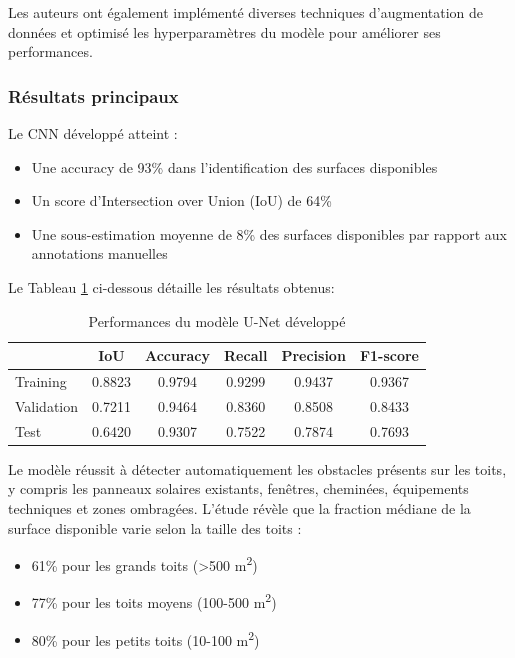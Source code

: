 \par{Les auteurs ont également implémenté diverses techniques d'augmentation de données et optimisé les hyperparamètres du modèle pour améliorer ses performances.}

\subsubsection{Résultats principaux}
Le CNN développé atteint :
\begin{itemize}
    \item Une accuracy de 93\% dans l'identification des surfaces disponibles
    \item Un score d'Intersection over Union (IoU) de 64\%
    \item Une sous-estimation moyenne de 8\% des surfaces disponibles par rapport aux annotations manuelles
\end{itemize}
\par{Le Tableau \ref{tab:castello_quantification_resultats} ci-dessous détaille les résultats obtenus:}
\begin{table}[H]
    \centering
    \begin{tabular}{|l|c|c|c|c|c|}
    \hline
     & IoU & Accuracy & Recall & Precision & F1-score \\
    \hline
    Training & 0.8823 & 0.9794 & 0.9299 & 0.9437 & 0.9367 \\
    Validation & 0.7211 & 0.9464 & 0.8360 & 0.8508 & 0.8433 \\
    Test & 0.6420 & 0.9307 & 0.7522 & 0.7874 & 0.7693 \\
    \hline
    \end{tabular}
    \caption{Performances du modèle U-Net développé}
\label{tab:castello_quantification_resultats}
\end{table}

\par{Le modèle réussit à détecter automatiquement les obstacles présents sur les toits, y compris les panneaux solaires existants, fenêtres, cheminées, équipements techniques et zones ombragées. L'étude révèle que la fraction médiane de la surface disponible varie selon la taille des toits :}
\begin{itemize}
    \item 61\% pour les grands toits (>500 \si{\unit{m^2}})
    \item 77\% pour les toits moyens (100-500 \si{\unit{m^2}})
    \item 80\% pour les petits toits (10-100 \si{\unit{m^2}})
\end{itemize}

